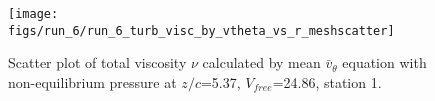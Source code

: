 \begin{figure}[H]
\centering
\texttt{[image: figs/run\_6/run\_6\_turb\_visc\_by\_vtheta\_vs\_r\_meshscatter]}
\caption{Scatter plot of total viscosity $\nu$ calculated by mean $\bar{v}_{\theta}$ equation with non-equilibrium pressure at $z/c$=5.37, $V_{free}$=24.86, station 1.}
\label{fig:run_6_turb_visc_by_vtheta_vs_r_meshscatter}
\end{figure}


